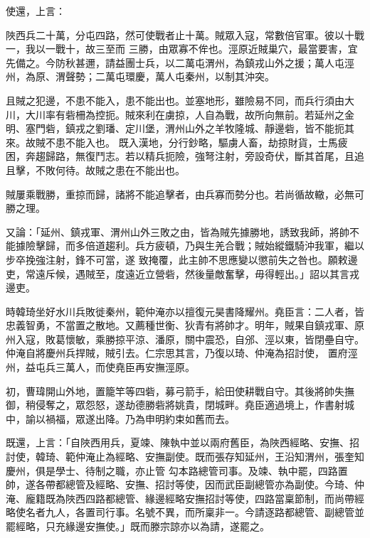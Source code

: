 \begin{pinyinscope}
 使還，上言：



 陜西兵二十萬，分屯四路，然可使戰者止十萬。賊眾入寇，常數倍官軍。彼以十戰一，我以一戰十，故三至而
 三勝，由眾寡不侔也。涇原近賊巢穴，最當要害，宜先備之。今防秋甚邇，請益團士兵，以二萬屯渭州，為鎮戎山外之援；萬人屯涇州，為原、渭聲勢；二萬屯環慶，萬人屯秦州，以制其沖突。



 且賊之犯邊，不患不能入，患不能出也。並塞地形，雖險易不同，而兵行須由大川，大川率有砦柵為控扼。賊來利在虜掠，人自為戰，故所向無前。若延州之金明、塞門砦，鎮戎之劉璠、定川堡，渭州山外之羊牧隆城、靜邊砦，皆不能扼其來。故賊不患不能入也。
 既入漢地，分行鈔略，驅虜人畜，劫掠財貨，士馬疲困，奔趨歸路，無復鬥志。若以精兵扼險，強弩注射，旁設奇伏，斷其首尾，且追且擊，不敗何待。故賊之患在不能出也。



 賊屢乘戰勝，重掠而歸，諸將不能追擊者，由兵寡而勢分也。若尚循故轍，必無可勝之理。



 又論：「延州、鎮戎軍、渭州山外三敗之由，皆為賊先據勝地，誘致我師，將帥不能據險擊歸，而多倍道趨利。兵方疲頓，乃與生羌合戰；賊始縱鐵騎沖我軍，繼以步卒挽強注射，鋒不可當，遂
 致掩覆，此主帥不思應變以懲前失之咎也。願敕邊吏，常遠斥候，遇賊至，度遠近立營砦，然後量敵奮擊，毋得輕出。」詔以其言戎邊吏。



 時韓琦坐好水川兵敗徙秦州，範仲淹亦以擅復元昊書降耀州。堯臣言：二人者，皆忠義智勇，不當置之散地。又薦種世衡、狄青有將帥才。明年，賊果自鎮戎軍、原州入寇，敗葛懷敏，乘勝掠平涼、潘原，關中震恐，自邠、涇以東，皆閉壘自守。仲淹自將慶州兵捍賊，賊引去。仁宗思其言，乃復以琦、仲淹為招討使，
 置府涇州，益屯兵三萬人，而使堯臣再安撫涇原。



 初，曹瑋開山外地，置籠竿等四砦，募弓箭手，給田使耕戰自守。其後將帥失撫御，稍侵奪之，眾怨怒，遂劫德勝砦將姚貴，閉城畔。堯臣適過境上，作書射城中，諭以禍福，眾遂出降。乃為申明約束如舊而去。



 既還，上言：「自陜西用兵，夏竦、陳執中並以兩府舊臣，為陜西經略、安撫、招討使，韓琦、範仲淹止為經略、安撫副使。既而張存知延州，王沿知渭州，張奎知慶州，俱是學士、待制之職，亦止管
 勾本路總管司事。及竦、執中罷，四路置帥，遂各帶都總管及經略、安撫、招討等使，因而武臣副總管亦為副使。今琦、仲淹、龐籍既為陜西四路都總管、緣邊經略安撫招討等使，四路當稟節制，而尚帶經略使名者九人，各置司行事。名號不異，而所稟非一。今請逐路都總管、副總管並罷經略，只充緣邊安撫使。」既而滕宗諒亦以為請，遂罷之。




\end{pinyinscope}
